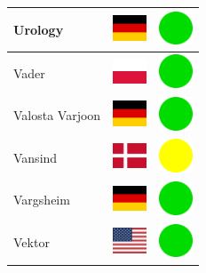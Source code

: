 \documentclass[12pt, a4paper, twoside]{report}
\begin{document}
\begin{center}
\begin{longtable}{|p{5cm}|p{2cm}|p{2cm}|}
 Urology                                                    & \includegraphics[width=1cm]{../img/flags/de} &   \includegraphics[width=1cm]{../likes/y} \\ \hline
 Vader                                                      & \includegraphics[width=1cm]{../img/flags/pl} &   \includegraphics[width=1cm]{../likes/y} \\ \hline
 Valosta Varjoon                                            & \includegraphics[width=1cm]{../img/flags/de} &   \includegraphics[width=1cm]{../likes/y} \\ \hline
 Vansind                                                    & \includegraphics[width=1cm]{../img/flags/dk} &   \includegraphics[width=1cm]{../likes/m} \\ \hline
 Vargsheim                                                  & \includegraphics[width=1cm]{../img/flags/de} &   \includegraphics[width=1cm]{../likes/y} \\ \hline
 Vektor                                                     & \includegraphics[width=1cm]{../img/flags/us} &   \includegraphics[width=1cm]{../likes/y} \\ \hline

\end{longtable}
\end{center}
\end{document}

